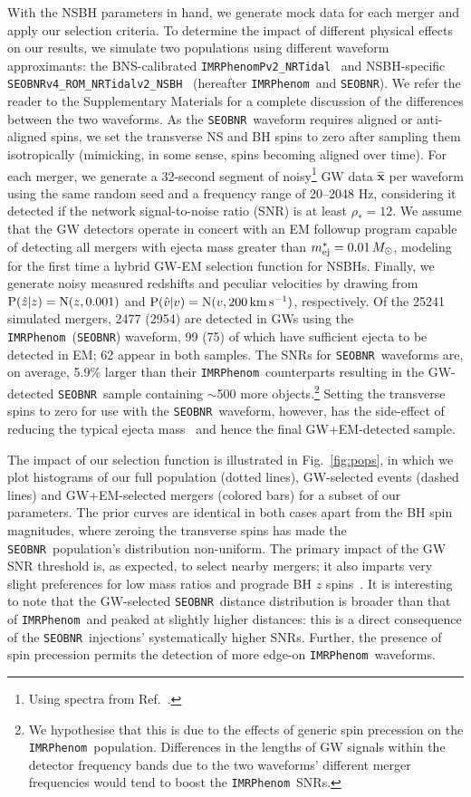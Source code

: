 \documentclass[%
 reprint,
 superscriptaddress,
 nofootinbib,
 amsmath,amssymb,
 aps,
]{revtex4-2}
\newcommand{\vobs}{\ensuremath{\hat{v}}}
\newcommand{\zobs}{\ensuremath{\hat{z}}}
\newcommand{\prob}{\ensuremath{{\rm P}}}
\newcommand{\normal}{{\rm{N}}}
\newcommand{\snrmin}{\rho_*}
\newcommand{\mejmin}{m_{\rm ej}^*}
\newcommand{\dgw}{\hat{\bm{x}}}
\newcommand{\kms}{\ensuremath{{\rm km\,s^{-1}}}}
\newcommand{\seobnr}{\texttt{SEOBNR}}
\newcommand{\seobnrfull}{\texttt{SEOBNRv4\_ROM\_NRTidalv2\_NSBH}}
\newcommand{\imrp}{\texttt{IMRPhenom}}
\newcommand{\imrpfull}{\texttt{IMRPhenomPv2\_NRTidal}}
\begin{document}
With the NSBH parameters in hand, we generate mock data for each merger and apply our selection criteria.  To determine the impact of different physical effects on our results, we simulate two populations using different waveform approximants: the BNS-calibrated \imrpfull~\cite{Dietrich_etal:2019} and NSBH-specific \seobnrfull~\cite{Matas_etal:2020} (hereafter \imrp\ and \seobnr). We refer the reader to the Supplementary Materials for a complete discussion of the differences between the two waveforms. As the \seobnr\ waveform requires aligned or anti-aligned spins, we set the transverse NS and BH spins to zero after sampling them isotropically (mimicking, in some sense, spins becoming aligned over time). For each merger, we generate a 32-second segment of noisy\footnote{Using spectra from Ref.~\cite{LVCnoise}.} GW data $\dgw$ per waveform using the same random seed and a frequency range of 20--2048 Hz, considering it detected if the network signal-to-noise ratio (SNR) is at least $\snrmin = 12$. We assume that the GW detectors operate in concert with an EM followup program capable of detecting all mergers with ejecta mass greater than $\mejmin = 0.01\,M_\odot$, modeling for the first time a hybrid GW-EM selection function for NSBHs. Finally, we generate noisy measured redshifts and peculiar velocities by drawing from $\prob(\zobs|z)=\normal(z,0.001)$ and $\prob(\vobs|v)=\normal(v,200\,\kms)$, respectively. Of the 25241 simulated mergers, 2477 (2954) are detected in GWs using the \imrp\ (\seobnr) waveform, 99 (75) of which have sufficient ejecta to be detected in EM; 62 appear in both samples. The SNRs for \seobnr\ waveforms are, on average, 5.9\% larger than their \imrp\ counterparts resulting in the GW-detected \seobnr\ sample containing $\sim$500 more objects.\footnote{We hypothesise that this is due to the effects of generic spin precession on the \imrp\ population. Differences in the lengths of GW signals within the detector frequency bands due to the two waveforms' different merger frequencies would tend to boost the \imrp\ SNRs.}  Setting the transverse spins to zero for use with the \seobnr\ waveform, however, has the side-effect of reducing the typical ejecta mass~\cite{Foucart_etal:2018} and hence the final GW+EM-detected sample.

The impact of our selection function is illustrated in Fig.~\ref{fig:pops}, in which we plot histograms of our full population (dotted lines), GW-selected events (dashed lines) and GW+EM-selected mergers (colored bars) for a subset of our parameters. The prior curves are identical in both cases apart from the BH spin magnitudes, where zeroing the transverse spins has made the \seobnr\ population's distribution non-uniform. The primary impact of the GW SNR threshold is, as expected, to select nearby mergers; it also imparts very slight preferences for low mass ratios and prograde BH $z$ spins~\cite{Ng_etal:2018}. It is interesting to note that the GW-selected \seobnr\ distance distribution is broader than that of \imrp\ and peaked at slightly higher distances: this is a direct consequence of the \seobnr\ injections' systematically higher SNRs. Further, the presence of spin precession permits the detection of more edge-on \imrp\ waveforms.
\end{document}
